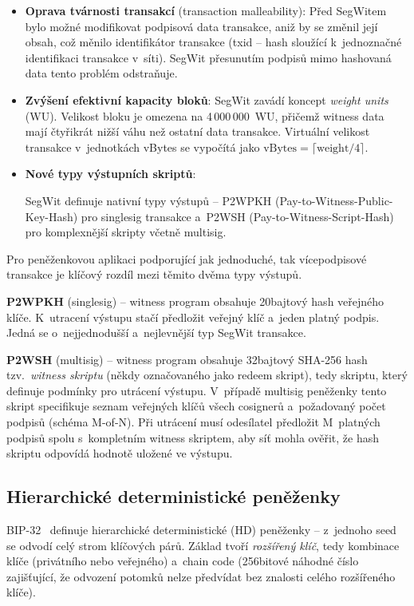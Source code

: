 \begin{itemize}
  \item \textbf{Oprava tvárnosti transakcí} (transaction malleability):
    Před SegWitem bylo možné modifikovat podpisová data transakce, aniž by se
    změnil její obsah, což měnilo identifikátor transakce (txid -- hash
    sloužící k~jednoznačné identifikaci transakce v~síti). SegWit přesunutím
    podpisů mimo hashovaná data tento problém odstraňuje.
  \item \textbf{Zvýšení efektivní kapacity bloků}: SegWit zavádí koncept
    \emph{weight units} (WU). Velikost bloku je omezena na 4\,000\,000~WU,
    přičemž witness data mají čtyřikrát nižší váhu než ostatní data transakce.
    Virtuální velikost transakce v~jednotkách vBytes se vypočítá jako
    $\text{vBytes} = \lceil \text{weight} / 4 \rceil$.
  \item \textbf{Nové typy výstupních skriptů}: {\sloppy SegWit definuje nativní typy
    výstupů -- P2WPKH (Pay-to-Witness-Public-Key-Hash)
    pro singlesig transakce a~P2WSH
    (Pay-to-Witness-Script-Hash) pro komplexnější skripty
    včetně multisig.\par}
\end{itemize}

Pro peněženkovou aplikaci podporující jak jednoduché, tak vícepodpisové
transakce je klíčový rozdíl mezi těmito dvěma typy výstupů.

\textbf{P2WPKH} (singlesig) -- witness program obsahuje 20bajtový hash
veřejného klíče. K~utracení výstupu stačí předložit veřejný klíč a~jeden
platný podpis. Jedná se o~nejjednodušší a~nejlevnější typ SegWit transakce.

\textbf{P2WSH} (multisig) -- witness program obsahuje 32bajtový SHA-256 hash
tzv.\ \emph{witness skriptu} (někdy označovaného jako redeem skript), tedy
skriptu, který definuje podmínky pro utrácení výstupu. V~případě multisig
peněženky tento skript specifikuje seznam veřejných klíčů všech cosignerů
a~požadovaný počet podpisů (schéma M-of-N). Při utrácení musí odesílatel
předložit M~platných podpisů spolu s~kompletním witness skriptem, aby síť
mohla ověřit, že hash skriptu odpovídá hodnotě uložené ve výstupu.

\subsection{Hierarchické deterministické peněženky}
\label{sec:hd-wallets}

BIP-32~\citep{BIP32} definuje hierarchické deterministické (HD) peněženky --
z~jednoho seed se odvodí celý strom klíčových párů. Základ tvoří
\emph{rozšířený klíč}, tedy kombinace klíče (privátního nebo veřejného)
a~chain code (256bitové náhodné číslo zajišťující, že odvození potomků
nelze předvídat bez znalosti celého rozšířeného klíče).

